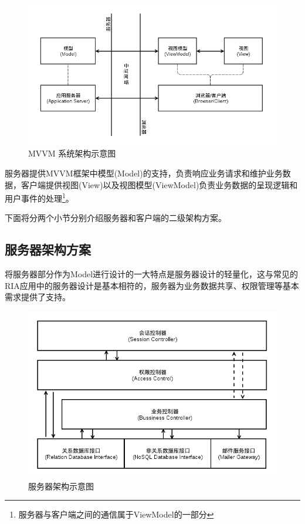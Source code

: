 \begin{figure}[!h]
  \begin{center}
    \includegraphics[scale=0.5]{figures/diagram-architecture-mvvm.png}
    \caption{MVVM 系统架构示意图\label{ArchitectureMVVM}}
  \end{center}
\end{figure}

服务器提供MVVM框架中模型(Model)的支持，负责响应业务请求和维护业务数据，客户端提供视图(View)以及视图模型(ViewModel)负责业务数据的呈现逻辑和用户事件的处理\footnote{服务器与客户端之间的通信属于ViewModel的一部分}。

下面将分两个小节分别介绍服务器和客户端的二级架构方案。

\subsection{服务器架构方案}

将服务器部分作为Model进行设计的一大特点是服务器设计的轻量化，这与常见的RIA应用中的服务器设计是基本相符的，服务器为业务数据共享、权限管理等基本需求提供了支持。

\begin{figure}[!h]
  \begin{center}
    \includegraphics[scale=0.5]{figures/diagram-architecture-server.png}
    \caption{服务器架构示意图\label{ArchitectureServer}}
  \end{center}
\end{figure}

